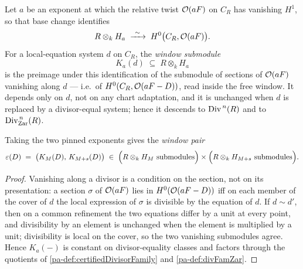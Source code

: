 \begin{definition}
  \label{pa-def:divisorWindow}
  \leanok

  Let \(a\) be an exponent at which the relative twist \(\mathcal{O}(aF)\) on \(C_R\) has vanishing
  \(H^1\), so that base change identifies
  \[
    R \otimes_k H_a \;\xrightarrow{\ \sim\ }\; H^0\bigl(C_R, \mathcal{O}(aF)\bigr).
  \]
  For a local-equation system \(d\) on \(C_R\), the \emph{window submodule}
  \[
    K_a(d) \;\subseteq\; R \otimes_k H_a
  \]
  is the preimage under this identification of the submodule of sections of \(\mathcal{O}(aF)\)
  vanishing along \(d\) --- i.e.\ of \(H^0(C_R, \mathcal{O}(aF - D))\), read inside the free
  window. It depends only on \(d\), not on any chart adaptation, and it is unchanged when
  \(d\) is replaced by a divisor-equal system; hence it descends to \(\operatorname{Div}^{\,n}(R)\) and to
  \(\operatorname{Div}^{\,n}_{\mathrm{Zar}}(R)\).

  Taking the two pinned exponents gives the \emph{window pair}
  \[
    \varepsilon(D) \;=\; \bigl(K_M(D),\, K_{M+s}(D)\bigr)
      \;\in\; \Bigl(R \otimes_k H_M \ \text{submodules}\Bigr)
        \times \Bigl(R \otimes_k H_{M+s}\ \text{submodules}\Bigr).
  \]
\end{definition}
\begin{proof}
  \leanok
  Vanishing along a divisor is a condition on the section, not on its presentation:
  a section \(\sigma\) of \(\mathcal{O}(aF)\) lies in \(H^0(\mathcal{O}(aF-D))\) iff on each member of the
  cover of \(d\) the local expression of \(\sigma\) is divisible by the equation of \(d\).
  If \(d \sim d'\), then on a common refinement the two equations differ by a unit at every
  point, and divisibility by an element is unchanged when the element is multiplied by a
  unit; divisibility is local on the cover, so the two vanishing submodules agree. Hence
  \(K_a(-)\) is constant on divisor-equality classes and factors through the quotients of
  \ref{pa-def:certifiedDivisorFamily} and \ref{pa-def:divFamZar}.
\end{proof}

